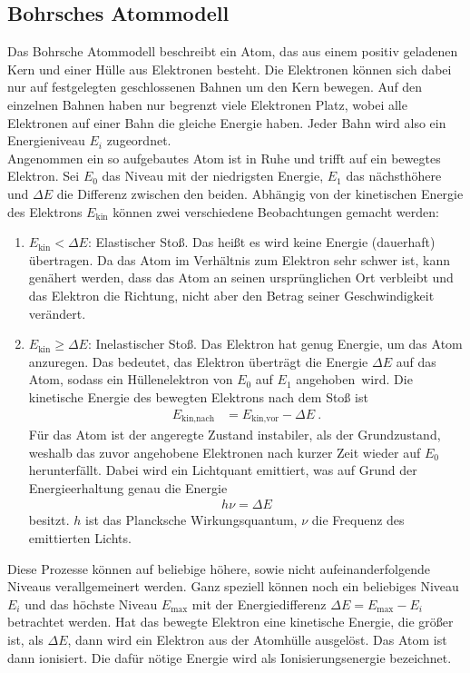 \subsection{Bohrsches Atommodell}
Das Bohrsche Atommodell beschreibt ein Atom, das aus einem positiv geladenen Kern und einer Hülle aus Elektronen besteht. Die Elektronen können sich dabei nur auf festgelegten geschlossenen Bahnen um den Kern bewegen. Auf den einzelnen Bahnen haben nur begrenzt viele Elektronen Platz, wobei alle Elektronen auf einer Bahn die gleiche Energie haben. Jeder Bahn wird also ein Energieniveau $E_i$ zugeordnet. \cite[Kap. 14.1.1]{Walcher}\\
Angenommen ein so aufgebautes Atom ist in Ruhe und trifft auf ein bewegtes Elektron. Sei $E_0$ das Niveau mit der niedrigsten Energie, $E_1$ das nächsthöhere und $\Delta E$ die Differenz zwischen den beiden. Abhängig von der kinetischen Energie des Elektrons $E_\text{kin}$ können zwei verschiedene Beobachtungen gemacht werden:
\begin{enumerate}
	\item $E_\text{kin}<\Delta E$: Elastischer Stoß. Das heißt es wird keine Energie (dauerhaft) übertragen. Da das Atom im Verhältnis zum Elektron sehr schwer ist, kann genähert werden, dass das Atom an seinen ursprünglichen Ort verbleibt und das Elektron die Richtung, nicht aber den Betrag seiner Geschwindigkeit verändert.
	\item $E_\text{kin}\geq\Delta E$: Inelastischer Stoß. Das Elektron hat genug Energie, um das Atom anzuregen. Das bedeutet, das Elektron überträgt die Energie $\Delta E$ auf das Atom, sodass ein Hüllenelektron von $E_0$ auf $E_1$ \grqq angehoben\grqq\ wird. Die kinetische Energie des bewegten Elektrons nach dem Stoß ist
	\begin{align}
		E_\text{kin,nach} &= E_\text{kin,vor} - \Delta E \ .
	\end{align}
	Für das Atom ist der angeregte Zustand instabiler, als der Grundzustand, weshalb das zuvor angehobene Elektronen nach kurzer Zeit wieder auf $E_0$ \grqq herunterfällt\grqq. Dabei wird ein Lichtquant emittiert, was auf Grund der Energieerhaltung genau die Energie
	\begin{align}
		h\nu = \Delta E
	\end{align}
	besitzt. $h$ ist das Plancksche Wirkungsquantum, $\nu$ die Frequenz des emittierten Lichts.
\end{enumerate}
Diese Prozesse können auf beliebige höhere, sowie nicht aufeinanderfolgende Niveaus verallgemeinert werden. Ganz speziell können noch ein beliebiges Niveau $E_i$ und das höchste Niveau $E_\text{max}$ mit der Energiedifferenz $\Delta E = E_\text{max}-E_i$ betrachtet werden. Hat das bewegte Elektron eine kinetische Energie, die größer ist, als $\Delta E$, dann wird ein Elektron aus der Atomhülle ausgelöst. Das Atom ist dann ionisiert. Die dafür nötige Energie wird als Ionisierungsenergie bezeichnet.
\clearpage

